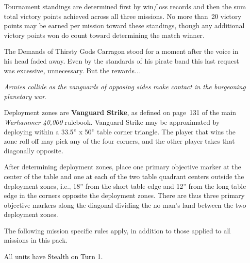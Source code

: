 \documentclass{40k}
\begin{document}
\begin{multicols}{2}
Tournament standings are determined first by win/loss records and then
the sum total victory points achieved across all three missions.  No
more than~20 victory points may be earned per mission toward these
standings, though any additional victory points won do count toward
determining the match winner.

\vfill
\begin{story}{24pt}{The Demands of Thirsty Gods}
  Carragon stood for a moment after the voice in his head faded away.
  Even by the standards of his pirate band this last request was
  excessive, unnecessary.  But the rewards...
\end{story}

\end{multicols}


\centerline{\emph{Armies collide as the vanguards of opposing sides
    make contact in the burgeoning planetary war.}}


Deployment zones are \textbf{Vanguard Strike}, as defined on page~131
of the main \emph{Warhammer 40,000} rulebook.  Vanguard Strike may be
approximated by deploying within a 33.5'' x 50'' table corner
triangle.  The player that wins the zone roll off may pick any of the
four corners, and the other player takes that diagonally opposite.

\bigskip%
After determining deployment zones, place one primary objective marker
at the center of the table and one at each of the two table quadrant
centers outside the deployment zones, i.e., 18'' from the short table
edge and 12'' from the long table edge in the corners opposite the
deployment zones.  There are thus three primary objective markers
along the diagonal dividing the no man's land between the two
deployment zones.


The following mission specific rules apply, in addition to those
applied to all missions in this pack.

  All units have Stealth on Turn 1.



\end{document}

